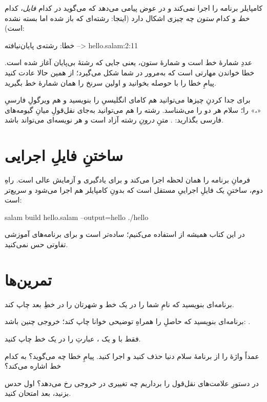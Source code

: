 کامپایلر برنامه را اجرا نمی‌کند و در عوض پیامی می‌دهد که می‌گوید در کدام
\emph{فایل}، کدام \emph{خط} و کدام \emph{ستون} چه چیزی اشکال دارد (اینجا:
رشته‌ای که باز شده اما بسته نشده است):

\begin{progoutfa}
خطا: رشته‌ی پایان‌نیافته
 --> hello.salam:2:11
\end{progoutfa}

عددِ  شمارهٔ خط است و  شمارهٔ ستون، یعنی جایی که رشتهٔ
بی‌پایان آغاز شده است. خطا خواندن مهارتی است که به‌مرور در شما شکل می‌گیرد؛
از همین حالا عادت کنید پیامِ خطا را با حوصله بخوانید و اولین سرنخ را همان
شمارهٔ خط بگیرید.

\begin{tip}
برای جدا کردنِ چیزها می‌توانید هم کامای انگلیسیِ \code{,} را بنویسید و هم
ویرگولِ فارسیِ «،» را؛ سلام هر دو را می‌شناسد. رشته را هم می‌توانید به‌جای
نقل‌قولِ  میانِ گیومه‌های فارسی بگذارید: .
متنِ \emph{درونِ} رشته آزاد است و هر نویسه‌ای می‌تواند باشد.
\end{tip}

\section{ساختنِ فایلِ اجرایی}

فرمانِ  برنامه را همان لحظه اجرا می‌کند و برای یادگیری و
آزمایش عالی است. راهِ دوم، ساختنِ یک فایلِ اجراییِ مستقل است که بدونِ
کامپایلر هم اجرا می‌شود و سریع‌تر است:

\begin{shell}
salam build hello.salam --output=hello
./hello
\end{shell}

در این کتاب همیشه از  استفاده می‌کنیم؛ ساده‌تر است و برای
برنامه‌های آموزشی تفاوتی حس نمی‌کنید.

\section{تمرین‌ها}

\exercise برنامه‌ای بنویسید که نامِ شما را در یک خط و شهرتان را در خطِ بعد
چاپ کند.

\exercise برنامه‌ای بنویسید که حاصلِ  را همراهِ توضیحی خوانا
چاپ کند؛ خروجی چنین باشد: .

\exercise فقط با  و یک ، عبارتِ
 را در یک خط چاپ کنید.

\exercise عمداً واژهٔ  را از برنامهٔ سلام دنیا حذف کنید و اجرا
کنید. پیامِ خطا چه می‌گوید؟ به کدام خط اشاره می‌کند؟

\exercise در دستورِ  علامت‌های نقل‌قول را برداریم چه
تغییری در خروجی رخ می‌دهد؟ اول حدس بزنید، بعد امتحان کنید.
